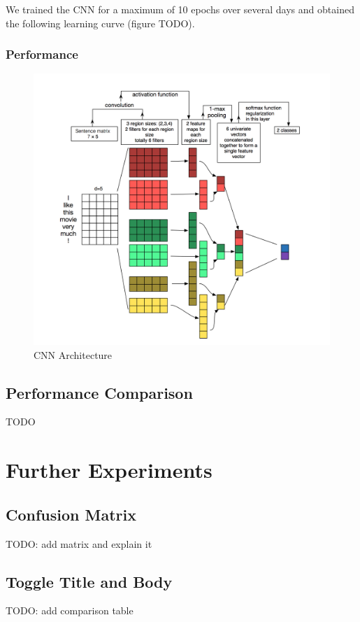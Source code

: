 \documentclass{sig-alternate-05-2015}
\begin{document}
We trained the CNN for a maximum of 10 epochs over several days and obtained the following learning curve (figure TODO).

\subsubsection{Performance}
\begin{figure}[H]
\centering
\includegraphics[width=\linewidth]{plots/multi-channel-CNN-architecture.png}
\caption{CNN Architecture}
\end{figure}

\subsection{Performance Comparison}
TODO

\section{Further Experiments}
\subsection{Confusion Matrix}
TODO: add matrix and explain it

\subsection{Toggle Title and Body}
TODO: add comparison table
\end{document}
